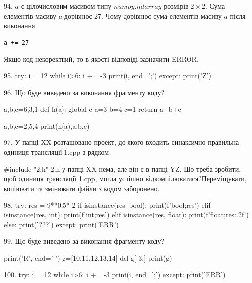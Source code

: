 \documentclass[11pt]{article}
\begin{document}
94. 
$a$ є цілочисловим масивом типу $numpy.ndarray$ розмірів $2{\times}2$. Сума елементів масиву $a$ дорівнює 27. Чому дорівнює сума елементів масиву $a$ після виконання 
\begin{verbatim}
a += 27
\end{verbatim}


Якщо код некоректний, то в якості відповіді зазначити ERROR.



95. 
try:
    i = 12
    while i>6:
        i += -3
    print(i, end=';')
except:
    print('Z')

96. Що буде виведено за виконання фрагменту коду?

a,b,c=6,3,1
def h(a):
global c    a=3
    b=4
    c=1
    return a+b+c

a,b,c=2,5,4
print(h(a),a,b,c)

97. 
У папці XX розташовано проект, до якого входить синаксично правильна одиниця трансляції 1.cpp з рядком\par
{\#}include "2.h"
 2.h у папці XX нема, але він є в папці YZ. Що треба зробити, щоб одиниця трансляції 1.cpp, могла успішно відкомпілюватися?Переміщувати, копіювати та змінювати файли з кодом заборонено.\par\vspace{1.5cm}
98. 
try:
    res = 9**0.5*-2
    if isinstance(res, bool):
        print(f'bool;{res}')
    elif isinstance(res, int):
        print(f'int;{res}')
    elif isinstance(res, float):
        print(f'float;{res:.2f}')
    else:
        print('???')
except:
    print('ERR')

99. Що буде виведено за виконання фрагменту коду?

print('R', end=' ')
g=[10,11,12,13,14]
del g[-3:]
print(g)


100. 
try:
    i = 12
    while i>6:
        i += -3
    print(i, end=';')
except:
    print('ERR')
\end{document}
